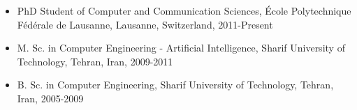 \documentclass[a4paper]{article}
\theoremstyle{definition}
\begin{document}
\begin{itemize}

\item PhD Student of Computer and Communication Sciences, \'{E}cole Polytechnique F\'{e}d\'{e}rale de Lausanne, Lausanne, Switzerland, 2011-Present 

%


\item M. Sc. in Computer Engineering - Artificial Intelligence, Sharif University of Technology, Tehran, Iran, 2009-2011 

%

\item B. Sc. in Computer Engineering, Sharif University of Technology, Tehran, Iran, 2005-2009 


\end{itemize}
\end{document}
